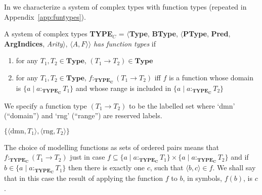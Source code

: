 In \nexteg{} we characterize a system of complex types with function
types (repeated in Appendix~\ref{app:funtypes}).
\begin{ex} 
A system of complex types {\bf TYPE$_C$} = $\langle${\bf Type}, {\bf BType},
$\langle$\textbf{PType}, {\bf Pred}, \textbf{ArgIndices}, {\it Arity\/}$\rangle$, $\langle A,F\rangle$$\rangle$ \textit{has function types} if
\begin{enumerate} 
 
\item for any $T_1,T_2 \in \textbf{Type}$, $(T_1\rightarrow T_2) \in \textbf{Type}$ 
 
\item for any $T_1,T_2 \in \textbf{Type}$, $f:_{\mathbf{TYPE_C}}(T_1\rightarrow T_2)$ iff
  $f$ is a function whose domain is $\{a\mid
  a:_{\mathbf{TYPE_C}}T_1\}$ and whose range is included in $\{a\mid a:_{\mathbf{TYPE_C}}T_2\}$ 
 
\end{enumerate}

\label{ex:funtypes}
\end{ex} 
We specify a function type $(T_1\rightarrow T_2)$ to be the labelled
  set \nexteg{} where `dmn' (``domain'') and `rng' (``range'') are reserved labels.
\begin{ex}
$\{\langle\mathrm{dmn},T_1\rangle,\langle\mathrm{rng},T_2\rangle\}$
\end{ex}

The choice of modelling functions as sets of ordered pairs means that
$f:_{\mathbf{TYPE_C}}(T_1\rightarrow T_2)$ just in case $f\subseteq \{a\mid
  a:_{\mathbf{TYPE_C}}T_1\} \times \{a\mid a:_{\mathbf{TYPE_C}}T_2\}$
  and if $b \in \{a\mid
  a:_{\mathbf{TYPE_C}}T_1\}$ then there is exactly one $c$, such that
  $\langle b,c\rangle\in f$.  We shall say that in this case the
  result of applying the function $f$ to $b$, in symbols, $f(b)$, is
  $c$.

